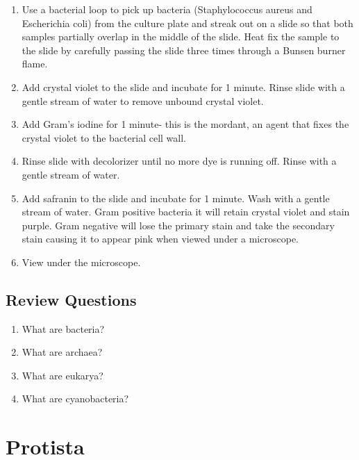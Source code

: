 \documentclass[]{book}
\providecommand{\tightlist}{%
  \setlength{\itemsep}{0pt}\setlength{\parskip}{0pt}}
\theoremstyle{definition}
\theoremstyle{definition}
\theoremstyle{definition}
\theoremstyle{remark}
\begin{document}
\begin{enumerate}
\def\labelenumi{\arabic{enumi}.}
\tightlist
\item
  Use a bacterial loop to pick up bacteria (Staphylococcus aureus and
  Escherichia coli) from the culture plate and streak out on a slide so
  that both samples partially overlap in the middle of the slide. Heat
  fix the sample to the slide by carefully passing the slide three times
  through a Bunsen burner flame.
\item
  Add crystal violet to the slide and incubate for 1 minute. Rinse slide
  with a gentle stream of water to remove unbound crystal violet.
\item
  Add Gram's iodine for 1 minute- this is the mordant, an agent that
  fixes the crystal violet to the bacterial cell wall.
\item
  Rinse slide with decolorizer until no more dye is running off. Rinse
  with a gentle stream of water.
\item
  Add safranin to the slide and incubate for 1 minute. Wash with a
  gentle stream of water. Gram positive bacteria it will retain crystal
  violet and stain purple. Gram negative will lose the primary stain and
  take the secondary stain causing it to appear pink when viewed under a
  microscope.
\item
  View under the microscope.
\end{enumerate}

\section{Review Questions}\label{review-questions-9}

\begin{enumerate}
\def\labelenumi{\arabic{enumi}.}
\tightlist
\item
  What are bacteria?
\item
  What are archaea?
\item
  What are eukarya?
\item
  What are cyanobacteria?
\end{enumerate}

\chapter{Protista}\label{protista}
\end{document}
